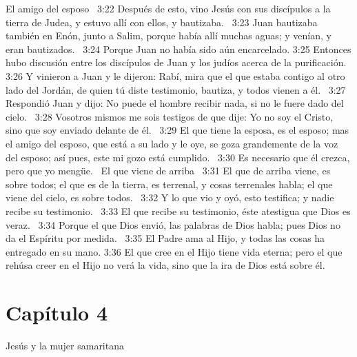 El amigo del esposo  
3:22 Después de esto, vino Jesús con sus discípulos a la tierra de Judea, y estuvo allí con ellos, y bautizaba.  
3:23 Juan bautizaba también en Enón, junto a Salim, porque había allí muchas aguas; y venían, y eran bautizados.  
3:24 Porque Juan no había sido aún encarcelado. 
3:25 Entonces hubo discusión entre los discípulos de Juan y los judíos acerca de la purificación.  
3:26 Y vinieron a Juan y le dijeron: Rabí, mira que el que estaba contigo al otro lado del Jordán, de quien tú diste testimonio, bautiza, y todos vienen a él.  
3:27 Respondió Juan y dijo: No puede el hombre recibir nada, si no le fuere dado del cielo.  
3:28 Vosotros mismos me sois testigos de que dije: Yo no soy el Cristo, sino que soy enviado delante de él.  
3:29 El que tiene la esposa, es el esposo; mas el amigo del esposo, que está a su lado y le oye, se goza grandemente de la voz del esposo; así pues, este mi gozo está cumplido.  
3:30 Es necesario que él crezca, pero que yo mengüe.  
El que viene de arriba  
3:31 El que de arriba viene, es sobre todos; el que es de la tierra, es terrenal, y cosas terrenales habla; el que viene del cielo, es sobre todos.  
3:32 Y lo que vio y oyó, esto testifica; y nadie recibe su testimonio.  
3:33 El que recibe su testimonio, éste atestigua que Dios es veraz.  
3:34 Porque el que Dios envió, las palabras de Dios habla; pues Dios no da el Espíritu por medida.  
3:35 El Padre ama al Hijo, y todas las cosas ha entregado en su mano. 
3:36 El que cree en el Hijo tiene vida eterna; pero el que rehúsa creer en el Hijo no verá la vida, sino que la ira de Dios está sobre él.  
\section*{Capítulo 4}
Jesús y la mujer samaritana  

